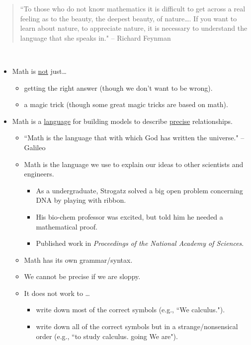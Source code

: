 \setcounter{chapter}{1}
\setcounter{section}{1}
\setcounter{theorem}{0}
\setcounter{equation}{0}



\begin{quote}
``To those who do not know mathematics it is difficult to get across a real feeling as to the beauty, the deepest beauty, of nature\dots. 
If you want to learn about nature, to appreciate nature, it is necessary to understand the language that she speaks in."
-- Richard Feynman
\end{quote}

\vfill

\begin{remark}\,
\begin{itemize}
\item Math is \underline{not} just\dots 
\begin{itemize}
\item getting the right answer (though we don't want to be wrong).
\item a magic trick (though some great magic tricks are based on math).
\end{itemize}
\vfill

\item Math is a \underline{language} for building models to describe \underline{precise} relationships.
\begin{itemize}
\item ``Math is the language that with which God has written the universe." -- Galileo
\item Math is the language we use to explain our ideas to other scientists and engineers. 
\begin{itemize}
\item As a undergraduate, Strogatz solved a big open problem concerning DNA by playing with ribbon.
\item His bio-chem professor was excited, but told him he needed a mathematical proof.
\item Published work in \textit{Proceedings of the National Academy of Sciences}.
\end{itemize}
\item Math has its own grammar/syntax.
\item We cannot be precise if we are sloppy.  
\item It does not work to \dots
\begin{itemize}
\item write down most of the correct symbols
	(e.g., ``We calculus.").
\item write down all of the correct symbols but in a strange/nonsensical order
	(e.g., ``to study calculus. going We are").
\end{itemize}
\end{itemize}
\vfill


\end{itemize}
\end{remark}
